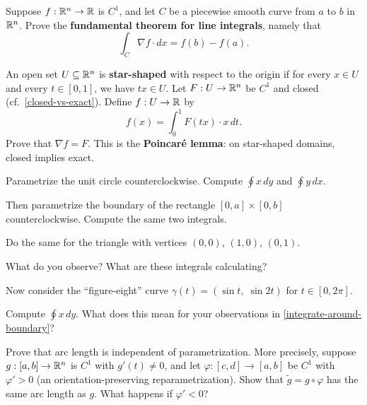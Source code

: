 \documentclass{homework}
\begin{document}
\begin{problem}\label{ftc-for-line-integrals}%
  Suppose $f:\mathbb{R}^n\to\mathbb{R}$ is $C^1$, and let $C$ be a piecewise smooth curve from $a$ to $b$ in $\mathbb{R}^n$.
  Prove the \textbf{fundamental theorem for line integrals}, namely that
  \[
    \int_C \nabla f\cdot dx = f(b)-f(a).
  \]
\end{problem}

\begin{problem}\label{poincare-lemma}%
  An open set $U\subseteq\mathbb{R}^n$ is \textbf{star-shaped} with respect to the
  origin if for every $x\in U$ and every $t\in[0,1]$, we have $tx\in U$.
  Let $F:U\to\mathbb{R}^n$ be $C^1$ and closed (cf.~\ref{closed-vs-exact}).
  Define $f:U\to\mathbb{R}$ by
  \[
    f(x)=\int_0^1 F(tx)\cdot x\,dt.
  \]
  Prove that $\nabla f = F$.
  This is the \textbf{Poincar\'e lemma}: on star-shaped domains, closed implies exact.
\end{problem}

\begin{problem}\label{integrate-around-boundary}%
  Parametrize the unit circle counterclockwise.
  Compute $\displaystyle\oint x\,dy$ and $\displaystyle \oint y\,dx$.

  Then parametrize the boundary of the rectangle $[0,a]\times[0,b]$ counterclockwise.
  Compute the same two integrals.

  Do the same for the triangle with vertices $(0,0)$, $(1,0)$, $(0,1)$.

  What do you observe? What are these integrals calculating?
\end{problem}

\begin{problem}
  Now consider the ``figure-eight'' curve $\gamma(t)=(\sin t,\;\sin 2t)$ for $t\in[0,2\pi]$.
  
  Compute $\displaystyle\oint x\,dy$.  What does this mean for your observations in \ref{integrate-around-boundary}?
\end{problem}

\begin{problem}
  Prove that arc length is independent of parametrization.
  More precisely, suppose $g:[a,b]\to\mathbb{R}^n$ is $C^1$ with $g'(t)\neq 0$,
  and let $\varphi:[c,d]\to[a,b]$ be $C^1$ with $\varphi'>0$ (an
  orientation-preserving reparametrization).
  Show that $\tilde g=g\circ\varphi$ has the same arc length as $g$.
  What happens if $\varphi'<0$?
\end{problem}

\end{document}
